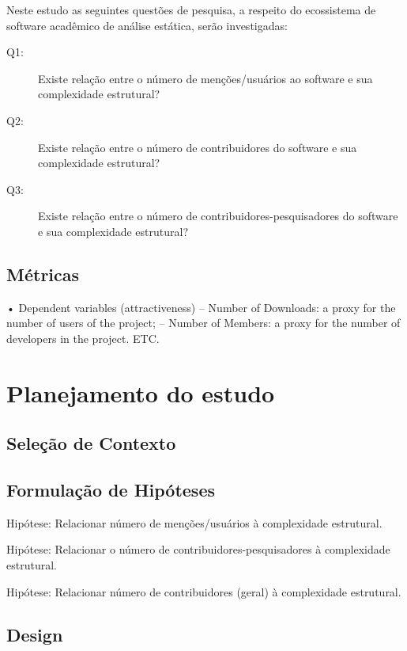 Neste estudo as seguintes questões de pesquisa, a respeito do ecossistema de
software acadêmico de análise estática, serão investigadas:

\newcommand{\QuestaoOne}{Existe relação entre o número de menções/usuários ao software e sua complexidade estrutural?}
\newcommand{\QuestaoTwo}{Existe relação entre o número de contribuidores do software e sua complexidade estrutural?}
\newcommand{\QuestaoThree}{Existe relação entre o número de contribuidores-pesquisadores do software e sua complexidade estrutural?}

\begin{description}
  \item [Q1:] \QuestaoOne
  \item [Q2:] \QuestaoTwo
  \item [Q3:] \QuestaoThree
\end{description}

\subsection{Métricas}

• Dependent variables (attractiveness)
– Number of Downloads: a proxy for the number of users of the project;
– Number of Members: a proxy for the number of developers in the project.
ETC.

\section{Planejamento do estudo}

\subsection{Seleção de Contexto}

\subsection{Formulação de Hipóteses}

Hipótese: Relacionar número de menções/usuários à complexidade estrutural.

Hipótese: Relacionar o número de contribuidores-pesquisadores à complexidade estrutural.

Hipótese: Relacionar número de contribuidores (geral) à complexidade estrutural.

\subsection{Design}

